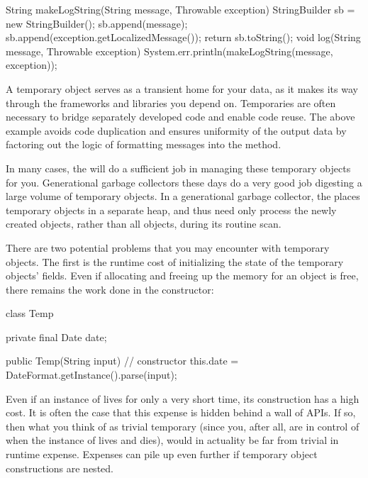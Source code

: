 \begin{shortlisting}
String makeLogString(String message, Throwable exception) {
	StringBuilder sb = new StringBuilder();
	sb.append(message);
	sb.append(exception.getLocalizedMessage());
	return sb.toString();
}
void log(String message, Throwable exception) {
	System.err.println(makeLogString(message, exception));
}
\end{shortlisting}

A temporary object serves as a transient home for your data, as it makes its way
through the frameworks and libraries you depend on. Temporaries are often
necessary to bridge separately developed code and enable code reuse. The above
example avoids code duplication and ensures uniformity of the output data by
factoring out the logic of formatting messages into the 
method.


In many cases, the \jre will do a sufficient job in managing these temporary
objects for you. Generational garbage collectors  these days do a very good job digesting a large volume of temporary
objects. In a generational garbage collector, the \jre places temporary objects
in a separate heap, and thus need only process the newly created objects, rather
than all objects, during its routine scan.

There are two potential problems that you may encounter with temporary objects.
The first is the runtime cost of initializing the state of the temporary
objects' fields. Even if allocating and freeing up the memory for an object is
free, there remains the work done in the constructor:

\begin{shortlisting}
class Temp {
	private final Date date;
	
	public Temp(String input) { // constructor
		this.date = DateFormat.getInstance().parse(input);
	}
}
\end{shortlisting}

Even if an instance of  lives for only a very short time, its
construction has a high cost. It is often the case that this expense is hidden
behind a wall of APIs. If so, then what you think of as trivial temporary (since
you, after all, are in control of when the instance of  lives and
dies), would in actuality be far from trivial in runtime expense. Expenses can
pile up even further if temporary object constructions are nested.

